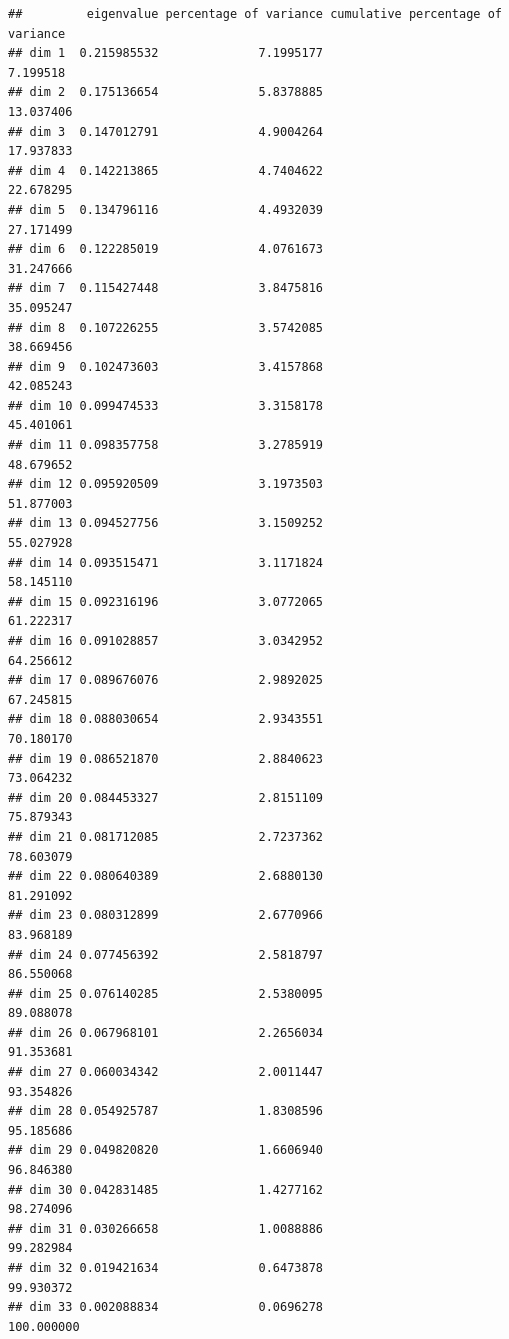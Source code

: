 \documentclass[
]{article}
\begin{document}
\begin{verbatim}
##         eigenvalue percentage of variance cumulative percentage of variance
## dim 1  0.215985532              7.1995177                          7.199518
## dim 2  0.175136654              5.8378885                         13.037406
## dim 3  0.147012791              4.9004264                         17.937833
## dim 4  0.142213865              4.7404622                         22.678295
## dim 5  0.134796116              4.4932039                         27.171499
## dim 6  0.122285019              4.0761673                         31.247666
## dim 7  0.115427448              3.8475816                         35.095247
## dim 8  0.107226255              3.5742085                         38.669456
## dim 9  0.102473603              3.4157868                         42.085243
## dim 10 0.099474533              3.3158178                         45.401061
## dim 11 0.098357758              3.2785919                         48.679652
## dim 12 0.095920509              3.1973503                         51.877003
## dim 13 0.094527756              3.1509252                         55.027928
## dim 14 0.093515471              3.1171824                         58.145110
## dim 15 0.092316196              3.0772065                         61.222317
## dim 16 0.091028857              3.0342952                         64.256612
## dim 17 0.089676076              2.9892025                         67.245815
## dim 18 0.088030654              2.9343551                         70.180170
## dim 19 0.086521870              2.8840623                         73.064232
## dim 20 0.084453327              2.8151109                         75.879343
## dim 21 0.081712085              2.7237362                         78.603079
## dim 22 0.080640389              2.6880130                         81.291092
## dim 23 0.080312899              2.6770966                         83.968189
## dim 24 0.077456392              2.5818797                         86.550068
## dim 25 0.076140285              2.5380095                         89.088078
## dim 26 0.067968101              2.2656034                         91.353681
## dim 27 0.060034342              2.0011447                         93.354826
## dim 28 0.054925787              1.8308596                         95.185686
## dim 29 0.049820820              1.6606940                         96.846380
## dim 30 0.042831485              1.4277162                         98.274096
## dim 31 0.030266658              1.0088886                         99.282984
## dim 32 0.019421634              0.6473878                         99.930372
## dim 33 0.002088834              0.0696278                        100.000000
\end{verbatim}
\end{document}
